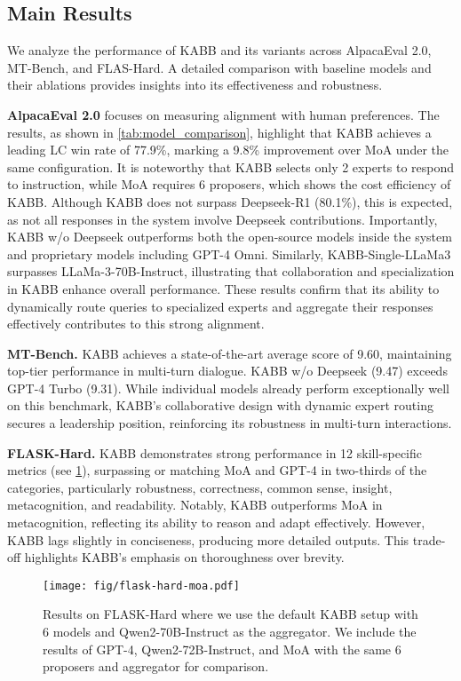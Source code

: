 \subsection{Main Results}

We analyze the performance of KABB and its variants across AlpacaEval 2.0, MT-Bench, and FLAS-Hard. A detailed comparison with baseline models and their ablations provides insights into its effectiveness and robustness.

\textbf{AlpacaEval 2.0} focuses on measuring alignment with human preferences. The results, as shown in \cref{tab:model_comparison}, highlight that KABB achieves a leading LC win rate of 77.9\%, marking a 9.8\% improvement over MoA under the same configuration. It is noteworthy that KABB selects only 2 experts to respond to instruction, while MoA requires 6 proposers, which shows the cost efficiency of KABB. Although KABB does not surpass Deepseek-R1 (80.1\%), this is expected, as not all responses in the system involve Deepseek contributions. Importantly, KABB w/o Deepseek outperforms both the open-source models inside the system and proprietary models including GPT-4 Omni. Similarly, KABB-Single-LLaMa3 surpasses LLaMa-3-70B-Instruct, illustrating that collaboration and specialization in KABB enhance overall performance. 
These results confirm that its ability to dynamically route queries to specialized experts and aggregate their responses effectively contributes to this strong alignment.

\textbf{MT-Bench.} KABB achieves a state-of-the-art average score of 9.60, maintaining top-tier performance in multi-turn dialogue. KABB w/o Deepseek (9.47) exceeds GPT-4 Turbo (9.31). While individual models already perform exceptionally well on this benchmark, KABB’s collaborative design with dynamic expert routing secures a leadership position, reinforcing its robustness in multi-turn interactions.

\textbf{FLASK-Hard.} KABB demonstrates strong performance in 12 skill-specific metrics (see \cref{falsk-hard}), surpassing or matching MoA and GPT-4 in two-thirds of the categories, particularly robustness, correctness, common sense, insight, metacognition, and readability. Notably, KABB outperforms MoA in metacognition, reflecting its ability to reason and adapt effectively. However, KABB lags slightly in conciseness, producing more detailed outputs. This trade-off highlights KABB's emphasis on thoroughness over brevity.

\begin{figure}[h]
\begin{center}
\centerline{\texttt{[image: fig/flask-hard-moa.pdf]}}
\caption{Results on FLASK-Hard where we use the default KABB setup with 6 models and Qwen2-70B-Instruct as the aggregator. We include the results of GPT-4, Qwen2-72B-Instruct, and MoA with the same 6 proposers and aggregator for comparison.}
\label{falsk-hard}
\end{center}
\vskip -0.3in
\end{figure}

